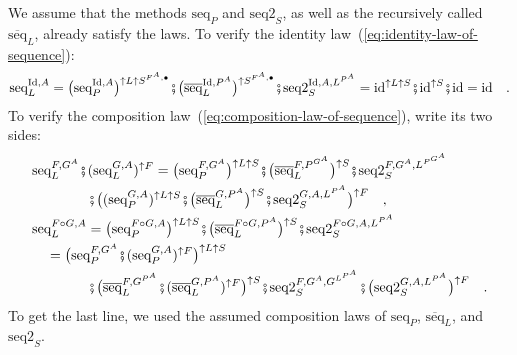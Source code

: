 We assume that the methods $\text{seq}_{P}$ and $\text{seq2}_{S}$,
as well as the recursively called $\overline{\text{seq}}_{L}$, already
satisfy the laws. To verify the identity law~(\ref{eq:identity-law-of-sequence}):
\[
\text{seq}_{L}^{\text{Id},A}=\big(\text{seq}_{P}^{\text{Id},A}\big)^{\uparrow L\uparrow S^{F^{A},\bullet}}\bef\big(\overline{\text{seq}}_{L}^{\text{Id},P^{A}}\big)^{\uparrow S^{F^{A},\bullet}}\bef\text{seq2}_{S}^{\text{Id},A,L^{P^{A}}}=\text{id}^{\uparrow L\uparrow S}\bef\text{id}^{\uparrow S}\bef\text{id}=\text{id}\quad.
\]
To verify the composition law~(\ref{eq:composition-law-of-sequence}),
write its two sides:
\begin{align*}
 & \text{seq}_{L}^{F,G^{A}}\bef(\text{seq}_{L}^{G,A})^{\uparrow F}=\big(\text{seq}_{P}^{F,G^{A}}\big)^{\uparrow L\uparrow S}\bef\big(\overline{\text{seq}}_{L}^{F,P^{G^{A}}}\big)^{\uparrow S}\bef\text{seq2}_{S}^{F,G^{A},L^{P^{G^{A}}}}\\
 & \quad\quad\quad\quad\bef\big((\text{seq}_{P}^{G,A})^{\uparrow L\uparrow S}\bef\big(\overline{\text{seq}}_{L}^{G,P^{A}}\big)^{\uparrow S}\bef\text{seq2}_{S}^{G,A,L^{P^{A}}}\big)^{\uparrow F}\quad,\\
 & \text{seq}_{L}^{F\circ G,A}=\big(\text{seq}_{P}^{F\circ G,A}\big)^{\uparrow L\uparrow S}\bef\big(\overline{\text{seq}}_{L}^{F\circ G,P^{A}}\big)^{\uparrow S}\bef\text{seq2}_{S}^{F\circ G,A,L^{P^{A}}}\\
 & \quad=\big(\text{seq}_{P}^{F,G^{A}}\bef(\text{seq}_{P}^{G,A})^{\uparrow F}\big)^{\uparrow L\uparrow S}\\
 & \quad\quad\quad\quad\bef\big(\overline{\text{seq}}_{L}^{F,G^{P^{A}}}\bef(\overline{\text{seq}}_{L}^{G,P^{A}})^{\uparrow F}\big)^{\uparrow S}\bef\text{seq2}_{S}^{F,G^{A},G^{L^{P^{A}}}}\bef\big(\text{seq2}_{S}^{G,A,L^{P^{A}}}\big)^{\uparrow F}\quad.
\end{align*}
To get the last line, we used the assumed composition laws of $\text{seq}_{P}$,
$\overline{\text{seq}}_{L}$, and $\text{seq2}_{S}$. 

